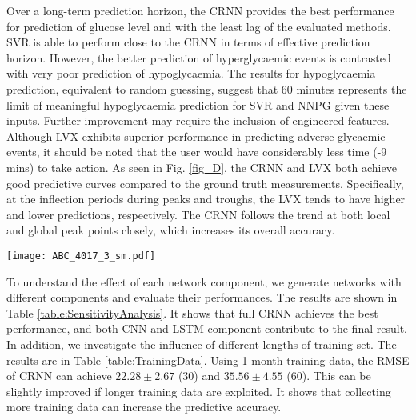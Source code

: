 \documentclass[a4paper, 10 pt, twocolumn]{IEEEtran}
\begin{document}
 {Over a long-term prediction horizon, the CRNN provides the best performance for prediction of glucose level and with the least lag of the evaluated methods. SVR is able to perform close to the CRNN in terms of effective
 prediction horizon. However, the better prediction of hyperglycaemic events is contrasted with very poor prediction of hypoglycaemia.  The results for hypoglycaemia prediction, equivalent to random guessing, suggest that
 60 minutes represents the limit of meaningful hypoglycaemia prediction for SVR and NNPG given these inputs. Further improvement may require the inclusion of engineered features. Although LVX exhibits superior performance
 in predicting adverse glycaemic events, it should be noted that the user would have considerably less time (-9 mins) to take action.} As seen in Fig. \ref{fig_D}, the CRNN and LVX both achieve good predictive curves
 compared to the ground truth measurements. Specifically, at the inflection periods during peaks and troughs, the LVX tends to have higher and lower predictions, respectively. The CRNN follows the trend at both local and
 global peak points closely, which increases its overall accuracy.


\begin{figure*}[!ht]
     \centering
         \texttt{[image: ABC\_4017\_3\_sm.pdf]}
             \caption{One-day period prediction results for clinical adult 17. The solid black line, dotted green line, solid magenta line, dashed blue line, dash-dotted red line  {indicate the real glucose measurements,
             the prediction results of ARX,  SVR, LVX, and the CRNN algorithm, respectively.} }
             \label{fig_D}
\end{figure*}



  {
To understand the effect of each network component, we generate networks with different components and evaluate their performances.}
The results are shown in Table \ref{table:SensitivityAnalysis}. It shows that full CRNN achieves the best performance, and both CNN and LSTM component contribute to the final result.  In addition, we investigate the
influence of different lengths of training set.  {The results are in Table \ref{table:TrainingData}.} Using 1 month training data, the RMSE of CRNN can achieve $22.28 \pm 2.67$ (30) and $35.56\pm 4.55$ (60). This can be
slightly improved if longer training data are exploited. It shows that collecting more training data can increase the predictive accuracy.
\end{document}
